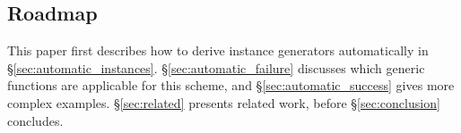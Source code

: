 \documentclass{llncs}
\begin{document}
\subsection{Roadmap}

This paper first describes how to derive instance generators automatically in \S\ref{sec:automatic_instances}. \S\ref{sec:automatic_failure} discusses which generic functions are applicable for this scheme, and \S\ref{sec:automatic_success} gives more complex examples. \S\ref{sec:related} presents related work, before \S\ref{sec:conclusion} concludes.


\begin{comment}
\section{Manual Instance Generators}
\label{sec:manual_instances}

There are currently three mechanisms for specifying and invoking instance generators -- all offering different levels of compiler integration and extensibility.

\subsection{Built in deriving}

The simplest instance generator is provided by Haskell itself, with the |deriving| keyword. The |Eq| instance given above could have been automatically derived by the compiler, simply by adding |deriving Eq| at the end of the data type declaration.

Unfortunately this scheme has two primary disadvantages. Firstly, the deriving keyword \textit{must} appear after the data type declaration -- if the data type is declared in a library, a new instance may not be derived. Secondly, only six inbuilt type classes are supported -- there is no way to add more.

\subsection{The DrIFT tool}

The DrIFT tool \cite{drift} is a Haskell preprocessor -- which examines a source file for special annotations, and appends the code for requested instances. DrIFT has support for 29 instance generators, but adding more requires making modifications to DrIFT itself.

To write an instance generator for DrIFT requires the implementation of a function, which takes a representation of a data type, and generates Haskell code. The code must be generated using special functions to ensure it has the correct layout. The author of an instance generator must be familiar with both the representation of the data structure, and with the code-generation functions.


\end{comment}
\end{document}
